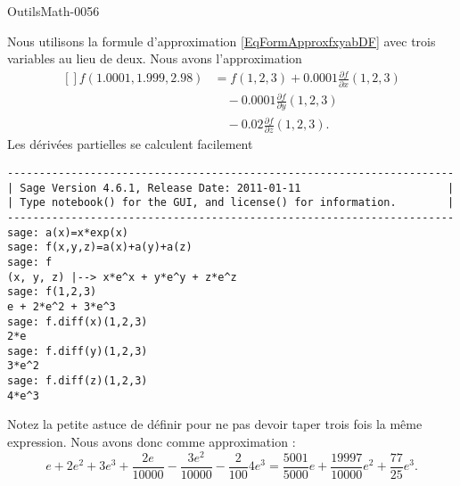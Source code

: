 
\begin{corrige}{OutilsMath-0056}

    Nous utilisons la formule d'approximation \eqref{EqFormApproxfxyabDF} avec trois variables au lieu de deux. Nous avons l'approximation
    \begin{equation}
        \begin{aligned}[]
            f(1.0001,1.999,2.98)&=f(1,2,3)+0.0001\frac{ \partial f }{ \partial x }(1,2,3)\\
            &\quad -0.0001\frac{ \partial f }{ \partial y }(1,2,3)\\
            &\quad -0.02\frac{ \partial f }{ \partial z }(1,2,3).
        \end{aligned}
    \end{equation}
    Les dérivées partielles se calculent facilement
    \begin{verbatim}
----------------------------------------------------------------------
| Sage Version 4.6.1, Release Date: 2011-01-11                       |
| Type notebook() for the GUI, and license() for information.        |
----------------------------------------------------------------------
sage: a(x)=x*exp(x)
sage: f(x,y,z)=a(x)+a(y)+a(z)
sage: f
(x, y, z) |--> x*e^x + y*e^y + z*e^z
sage: f(1,2,3)
e + 2*e^2 + 3*e^3
sage: f.diff(x)(1,2,3)
2*e
sage: f.diff(y)(1,2,3)
3*e^2
sage: f.diff(z)(1,2,3)
4*e^3
    \end{verbatim}
    Notez la petite astuce de définir  pour ne pas devoir taper trois fois la même expression. Nous avons donc comme approximation :
    \begin{equation}
        e+2e^2+3e^3+\frac{ 2e }{ 10000 }-\frac{ 3e^2 }{ 10000 }-\frac{ 2 }{ 100 }4e^3=\frac{ 5001 }{ 5000 }e+\frac{ 19997 }{ 10000 }e^2+\frac{ 77 }{ 25 }e^3.
    \end{equation}

\end{corrige}

